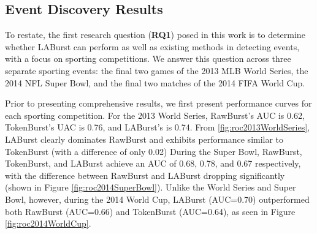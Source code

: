 \documentclass[letterpaper]{article}
\begin{document}
\subsection{Event Discovery Results}

To restate, the first research question (\textbf{RQ1}) posed in this work is to determine whether LABurst can perform as well as existing methods in detecting events, with a focus on sporting competitions.
We answer this question across three separate sporting events: the final two games of the 2013 MLB World Series, the 2014 NFL Super Bowl, and the final two matches of the 2014 FIFA World Cup.

Prior to presenting comprehensive results, we first present performance curves for each sporting competition.
For the 2013 World Series, RawBurst's AUC is 0.62, TokenBurst's UAC is 0.76, and LABurst's is 0.74. 
From \ref{fig:roc2013WorldSeries}, LABurst clearly dominates RawBurst and exhibits performance similar to TokenBurst (with a difference of only 0.02)
During the Super Bowl, RawBurst, TokenBurst, and LABurst achieve an AUC of 0.68, 0.78, and 0.67 respectively, with the difference between RawBurst and LABurst dropping significantly (shown in Figure \ref{fig:roc2014SuperBowl}).
Unlike the World Series and Super Bowl, however, during the 2014 World Cup, LABurst (AUC=0.70) outperformed both RawBurst (AUC=0.66) and TokenBurst (AUC=0.64), as seen in Figure \ref{fig:roc2014WorldCup}.
\end{document}
